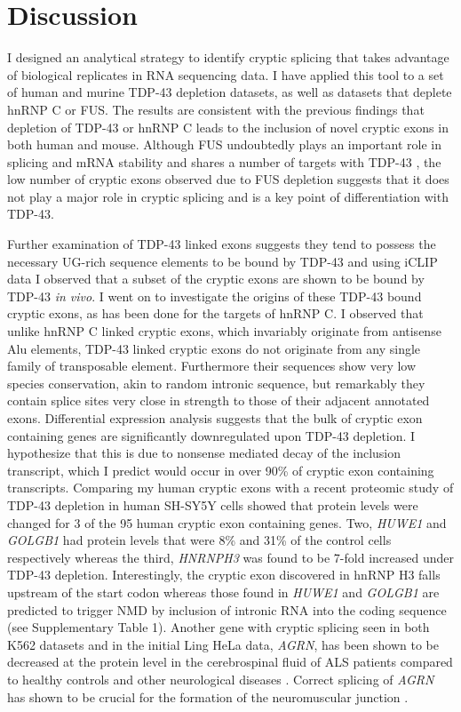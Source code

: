\section{Discussion}
I designed an analytical strategy to identify cryptic splicing that takes advantage of biological replicates in RNA sequencing data. I have applied this tool to a set of human and murine TDP-43 depletion datasets, as well as datasets that deplete hnRNP C or FUS. The results are consistent with the previous findings that depletion of TDP-43 or hnRNP C leads to the inclusion of novel cryptic exons in both human and mouse. Although FUS undoubtedly plays an important role in splicing and mRNA stability and shares a number of targets with TDP-43 \citep{Lagier-Tourenne2012-wa}, the low number of cryptic exons observed due to FUS depletion suggests that it does not play a major role in cryptic splicing and is a key point of differentiation with TDP-43.

Further examination of TDP-43 linked exons suggests they tend to possess the necessary UG-rich sequence elements to be bound by TDP-43 and using iCLIP data I observed that a subset of the cryptic exons are shown to be bound by TDP-43 \emph{in vivo}. I went on to investigate the origins of these TDP-43 bound cryptic exons, as has been done for the targets of hnRNP C. I observed that unlike hnRNP C linked cryptic exons, which invariably originate from antisense Alu elements, TDP-43 linked cryptic exons do not originate from any single family of transposable element. Furthermore their sequences show very low species conservation, akin to random intronic sequence, but remarkably they contain splice sites very close in strength to those of their adjacent annotated exons. Differential expression analysis suggests that the bulk of cryptic exon containing genes are significantly downregulated upon TDP-43 depletion. I hypothesize that this is due to nonsense mediated decay of the inclusion transcript, which I predict would occur in over 90\% of cryptic exon containing transcripts. Comparing my human cryptic exons with a recent proteomic study of TDP-43 depletion in human SH-SY5Y cells \citep{Stalekar2015-qd} showed that protein levels were changed for 3 of the 95 human cryptic exon containing genes. Two, \emph{HUWE1} and \emph{GOLGB1} had protein levels that were 8\% and 31\% of the control cells respectively whereas the third, \emph{HNRNPH3} was found to be 7-fold increased under TDP-43 depletion. Interestingly, the cryptic exon discovered in hnRNP H3 falls upstream of the start codon whereas those found in \emph{HUWE1} and \emph{GOLGB1} are predicted to trigger NMD by inclusion of intronic RNA into the coding sequence (see Supplementary Table 1).  Another gene with cryptic splicing seen in both K562 datasets and in the initial Ling HeLa data, \emph{AGRN}, has been shown to be decreased at the protein level in the cerebrospinal fluid of ALS patients compared to healthy controls and other neurological diseases \citep{Collins2015-xd}. Correct splicing of \emph{AGRN} has shown to be crucial for the formation of the neuromuscular junction \citep{Ruggiu2009-qx}.

